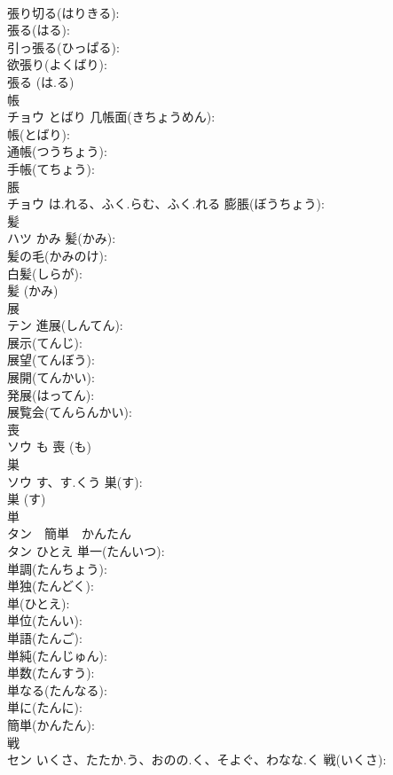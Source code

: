 \documentclass[8pt]{extreport}
\begin{document}
\begin{CJK}{UTF8}{min}
\\	張り切る(はりきる): 
\\	張る(はる): 
\\	引っ張る(ひっぱる): 
\\	欲張り(よくばり): 
\\	張る (は.る)
\\	帳			
\\	チョウ	とばり	几帳面(きちょうめん): 
\\	帳(とばり): 
\\	通帳(つうちょう): 
\\	手帳(てちょう): 
\\	脹			
\\	チョウ	は.れる、ふく.らむ、ふく.れる	膨脹(ぼうちょう): 
\\	髪			
\\	ハツ	かみ	髪(かみ): 
\\	髪の毛(かみのけ): 
\\	白髪(しらが): 
\\	髪 (かみ)
\\	展			
\\	テン		進展(しんてん): 
\\	展示(てんじ): 
\\	展望(てんぼう): 
\\	展開(てんかい): 
\\	発展(はってん): 
\\	展覧会(てんらんかい): 
\\	喪			
\\	ソウ	も		喪 (も)
\\	巣			
\\	ソウ	す、す.くう	巣(す): 
\\	巣 (す)
\\	単			
\\	タン　簡単　かんたん
\\	タン	ひとえ	単一(たんいつ): 
\\	単調(たんちょう): 
\\	単独(たんどく): 
\\	単(ひとえ): 
\\	単位(たんい): 
\\	単語(たんご): 
\\	単純(たんじゅん): 
\\	単数(たんすう): 
\\	単なる(たんなる): 
\\	単に(たんに): 
\\	簡単(かんたん): 
\\	戦			
\\	セン	いくさ、たたか.う、おのの.く、そよぐ、わなな.く	戦(いくさ): 

\end{CJK}
\end{document}
